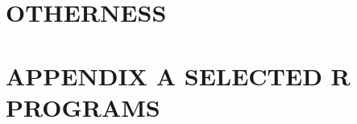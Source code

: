 \documentclass{BGSU}
\numberwithin{equation}{chapter}
\begin{document}
\chapter{\texorpdfstring{OTHERNESS}{}}


\backmatter







\mbox{}\newpage
{}
\appendix
\chapter{\texorpdfstring{APPENDIX A \hspace{0.25cm} SELECTED R PROGRAMS}{APPENDIX A}}

\end{document}
